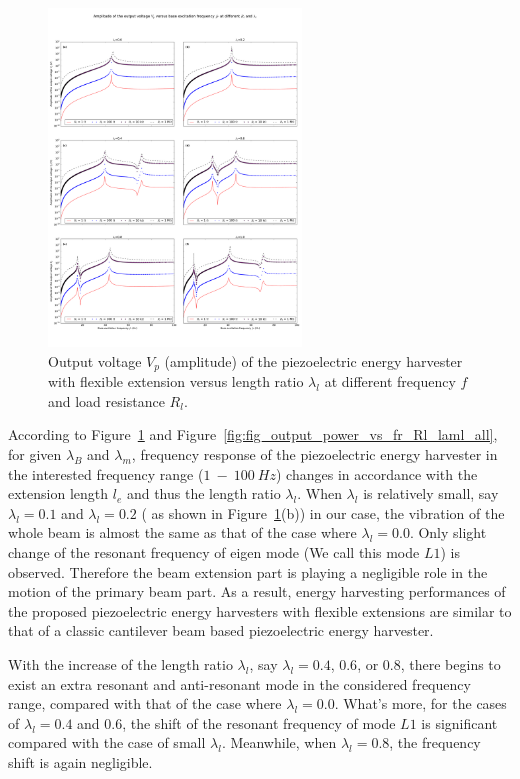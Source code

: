 \documentclass{elsarticle}
\begin{document}
\begin{figure}[!htbp]
    \centering
    \includegraphics[width=0.6\textwidth]{./fig_output_voltage_vs_fr_Rl_laml_all}
    \caption{Output voltage $V_p$ (amplitude) of the piezoelectric energy harvester with flexible extension versus length ratio $\lambda_l$ at different frequency $f$ and load resistance $R_l$. }
    \label{fig:fig_output_voltage_vs_fr_Rl_laml_all}
\end{figure}

According to Figure~\ref{fig:fig_output_voltage_vs_fr_Rl_laml_all} and Figure~\ref{fig:fig_output_power_vs_fr_Rl_laml_all}, for given $\lambda_B$ and $\lambda_m$, frequency response of the piezoelectric energy harvester in the interested frequency range ($1\ - \ 100\ Hz$) changes in accordance with the 
extension length $l_e$ and thus the length ratio $\lambda_l$. When $\lambda_l$ is relatively small, say $\lambda_l = 0.1$ and $\lambda_l = 0.2$ ( as shown in Figure~\ref{fig:fig_output_voltage_vs_fr_Rl_laml_all}(b)) in our case, the vibration of the whole beam is almost the same as that of the case where $\lambda_l = 0.0$. Only slight change of the resonant frequency of eigen mode (We call this mode $L1$) is observed. Therefore the beam extension part is playing a negligible role in the motion of the primary beam part. As a result, energy harvesting performances of the proposed piezoelectric energy harvesters with flexible extensions are similar to that of a classic cantilever beam based piezoelectric energy harvester. 

With the increase of the length ratio $\lambda_l$, say $\lambda_l = 0.4$, $0.6$, or $0.8$, there begins to exist an extra resonant and anti-resonant mode in the considered frequency range, compared with that of the case where $\lambda_l = 0.0$. What's more, for the cases of $\lambda_l = 0.4$ and $0.6$, the shift of the resonant frequency of mode $L1$ is significant compared with the case of small $\lambda_l$. Meanwhile, when $\lambda_l = 0.8$, the frequency shift is again negligible. 
\end{document}
